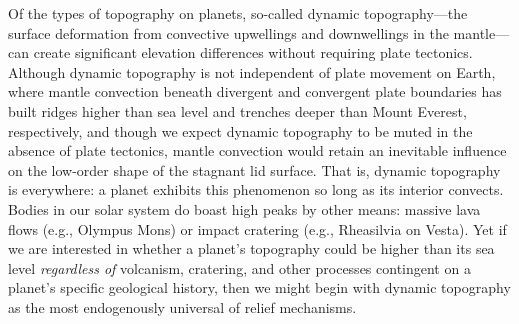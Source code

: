 \documentclass[trackchanges]{aastex63}
\newcommand{\todo}[1]{\textit{\textcolor{violet}{{#1}}}}
\newcommand{\jr}[1]{\textit{\textcolor{blue}{{#1}}}}
\begin{document}

Of the types of topography on planets, so-called dynamic topography---the surface deformation from convective upwellings and downwellings in the mantle---can create significant elevation differences without requiring plate tectonics. Although dynamic topography is not independent of plate movement on Earth, where mantle convection beneath divergent and convergent plate boundaries has built ridges higher than sea level and trenches deeper than Mount Everest, respectively, and though we expect dynamic topography to be muted in the absence of plate tectonics, mantle convection would retain an inevitable influence on the low-order shape of the stagnant lid surface. That is, dynamic topography is everywhere: a planet exhibits this phenomenon so long as its interior convects. Bodies in our solar system do boast high peaks by other means: massive lava flows (e.g., Olympus Mons) or impact cratering (e.g., Rheasilvia on Vesta). Yet if we are interested in whether a planet's topography could be higher than its sea level \emph{regardless of} volcanism, cratering, and other processes contingent on a planet's specific geological history, then we might begin with dynamic topography as the most endogenously universal of relief mechanisms. 



\end{document}
